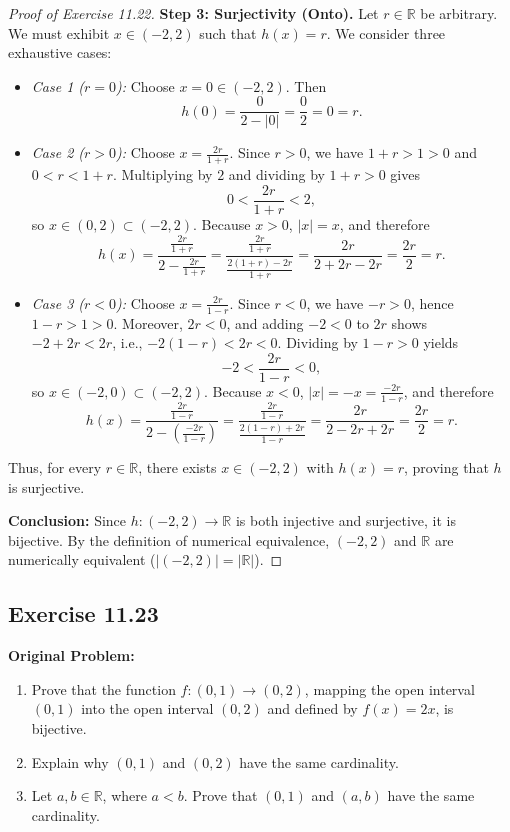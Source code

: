\documentclass[11pt, letterpaper]{article}
\theoremstyle{definition}
\theoremstyle{remark}
\begin{document}
\begin{proof}[Proof of Exercise 11.22]
\textbf{Step 3: Surjectivity (Onto).} Let $r \in \mathbb{R}$ be arbitrary. We must exhibit $x \in (-2, 2)$ such that $h(x) = r$. We consider three exhaustive cases:
\begin{itemize}
    \item \emph{Case 1 ($r = 0$):} Choose $x = 0 \in (-2, 2)$. Then
    \[
    h(0) = \frac{0}{2 - |0|} = \frac{0}{2} = 0 = r.
    \]
    \item \emph{Case 2 ($r > 0$):} Choose $x = \frac{2r}{1 + r}$. Since $r > 0$, we have $1 + r > 1 > 0$ and $0 < r < 1 + r$. Multiplying by $2$ and dividing by $1 + r > 0$ gives
    \[
    0 < \frac{2r}{1 + r} < 2,
    \]
    so $x \in (0, 2) \subset (-2, 2)$. Because $x > 0$, $|x| = x$, and therefore
    \[
    h(x) = \frac{\frac{2r}{1 + r}}{2 - \frac{2r}{1 + r}} = \frac{\frac{2r}{1 + r}}{\frac{2(1 + r) - 2r}{1 + r}} = \frac{2r}{2 + 2r - 2r} = \frac{2r}{2} = r.
    \]
    \item \emph{Case 3 ($r < 0$):} Choose $x = \frac{2r}{1 - r}$. Since $r < 0$, we have $-r > 0$, hence $1 - r > 1 > 0$. Moreover, $2r < 0$, and adding $-2 < 0$ to $2r$ shows $-2 + 2r < 2r$, i.e., $-2(1 - r) < 2r < 0$. Dividing by $1 - r > 0$ yields
    \[
    -2 < \frac{2r}{1 - r} < 0,
    \]
    so $x \in (-2, 0) \subset (-2, 2)$. Because $x < 0$, $|x| = -x = \frac{-2r}{1 - r}$, and therefore
    \[
    h(x) = \frac{\frac{2r}{1 - r}}{2 - \left(\frac{-2r}{1 - r}\right)} = \frac{\frac{2r}{1 - r}}{\frac{2(1 - r) + 2r}{1 - r}} = \frac{2r}{2 - 2r + 2r} = \frac{2r}{2} = r.
    \]
\end{itemize}
Thus, for every $r \in \mathbb{R}$, there exists $x \in (-2, 2)$ with $h(x) = r$, proving that $h$ is surjective.

\textbf{Conclusion:} Since $h : (-2, 2) \to \mathbb{R}$ is both injective and surjective, it is bijective. By the definition of numerical equivalence, $(-2, 2)$ and $\mathbb{R}$ are numerically equivalent ($|(-2, 2)| = |\mathbb{R}|$).
\end{proof}

\subsection{Exercise 11.23}

\textbf{Original Problem:}
\begin{enumerate}[label=(\alph*)]
    \item Prove that the function $f : (0, 1) \to (0, 2)$, mapping the open interval $(0, 1)$ into the open interval $(0, 2)$ and defined by $f(x) = 2x$, is bijective.
    \item Explain why $(0, 1)$ and $(0, 2)$ have the same cardinality.
    \item Let $a, b \in \mathbb{R}$, where $a < b$. Prove that $(0, 1)$ and $(a, b)$ have the same cardinality.
\end{enumerate}
\end{document}
